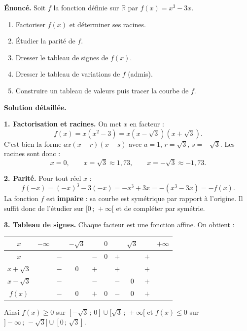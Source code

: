 \documentclass[11pt]{article}
\begin{document}
\begin{exoresolu}[Étude complète de $f(x) = x^3 - 3x$]
\textbf{Énoncé.} Soit $f$ la fonction définie sur $\mathbb{R}$ par $f(x) = x^3 - 3x$.
\begin{enumerate}
\item Factoriser $f(x)$ et déterminer ses racines.
\item Étudier la parité de $f$.
\item Dresser le tableau de signes de $f(x)$.
\item Dresser le tableau de variations de $f$ (admis).
\item Construire un tableau de valeurs puis tracer la courbe de $f$.
\end{enumerate}
\tcblower
\textbf{Solution détaillée.}

\textbf{1. Factorisation et racines.} On met $x$ en facteur :
\[ f(x) = x(x^2 - 3) = x(x - \sqrt{3})(x + \sqrt{3}). \]
C'est bien la forme $ax(x-r)(x-s)$ avec $a = 1$, $r = \sqrt{3}$, $s = -\sqrt{3}$. Les racines sont donc :
\[ x = 0, \qquad x = \sqrt{3} \approx 1{,}73, \qquad x = -\sqrt{3} \approx -1{,}73. \]

\textbf{2. Parité.} Pour tout réel $x$ :
\[ f(-x) = (-x)^3 - 3(-x) = -x^3 + 3x = -(x^3 - 3x) = -f(x). \]
La fonction $f$ est \textbf{impaire} : sa courbe est symétrique par rapport à l'origine. Il suffit donc de l'étudier sur $[0\,;\,+\infty[$ et de compléter par symétrie.

\textbf{3. Tableau de signes.} Chaque facteur est une fonction affine. On obtient :

\begin{center}
\begin{tabular}{|c|ccccccccc|}
\hline
$x$ & $-\infty$ & & $-\sqrt{3}$ & & $0$ & & $\sqrt{3}$ & & $+\infty$ \\
\hline
$x$ & & $-$ & & $-$ & $0$ & $+$ & & $+$ & \\
\hline
$x + \sqrt{3}$ & & $-$ & $0$ & $+$ & & $+$ & & $+$ & \\
\hline
$x - \sqrt{3}$ & & $-$ & & $-$ & & $-$ & $0$ & $+$ & \\
\hline
$f(x)$ & & $-$ & $0$ & $+$ & $0$ & $-$ & $0$ & $+$ & \\
\hline
\end{tabular}
\end{center}

Ainsi $f(x) \geq 0$ sur $[-\sqrt{3}\,;\,0] \cup [\sqrt{3}\,;\,+\infty[$ et $f(x) \leq 0$ sur $]-\infty\,;\,-\sqrt{3}] \cup [0\,;\,\sqrt{3}]$.


\end{exoresolu}
\end{document}
